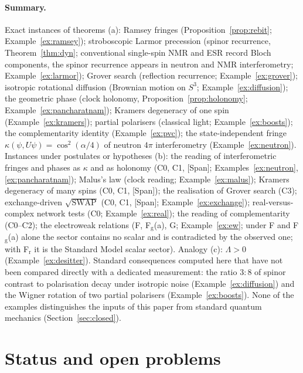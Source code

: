 \documentclass[aps,pra,onecolumn,superscriptaddress,nofootinbib,10pt]{revtex4-2}
\theoremstyle{definition}
\theoremstyle{remark}
\begin{document}
\paragraph{Summary.}  Exact instances of theorems (a): Ramsey fringes (Proposition~\ref{prop:rebit};
Example~\ref{ex:ramsey}); stroboscopic Larmor precession (spinor recurrence, Theorem~\ref{thm:dyn}; conventional single-spin NMR and
ESR record Bloch components, the spinor recurrence appears in neutron and NMR interferometry;
Example~\ref{ex:larmor}); Grover search (reflection
recurrence; Example~\ref{ex:grover}); isotropic rotational diffusion (Brownian motion on $S^3$;
Example~\ref{ex:diffusion}); the geometric phase (clock holonomy, Proposition~\ref{prop:holonomy};
Example~\ref{ex:pancharatnam}); Kramers degeneracy of one spin (Example~\ref{ex:kramers}); partial polarisers
(classical light; Example~\ref{ex:boosts}); the complementarity identity (Example~\ref{ex:pvc}); the
state-independent fringe $\kappa(\psi,U\psi)=\cos^2(\alpha/4)$ of neutron $4\pi$ interferometry
(Example~\ref{ex:neutron}).  Instances under postulates or hypotheses (b): the reading of interferometric
fringes and phases as $\kappa$ and as holonomy (C0, C1, [Span]; Examples~\ref{ex:neutron},
\ref{ex:pancharatnam}); Malus's law (clock reading; Example~\ref{ex:malus}); Kramers degeneracy of many spins
(C0, C1, [Span]); the realisation of Grover search (C3); exchange-driven $\sqrt{\mathrm{SWAP}}$ (C0, C1, [Span];
Example~\ref{ex:exchange}); real-versus-complex network tests (C0; Example~\ref{ex:real}); the reading of
complementarity (C0--C2); the electroweak relations (F, F$_{\mathrm g}$(a), G; Example~\ref{ex:ew}; under F and F$_{\mathrm g}$(a) alone the sector contains no scalar and is contradicted by the observed one; with F$_{\mathrm r}$ it is the Standard Model scalar sector).  Analogy (c): $\Lambda>0$
(Example~\ref{ex:desitter}).  Standard consequences computed here that have not been compared directly
with a dedicated measurement: the ratio $3:8$ of spinor contrast to polarisation decay under isotropic
noise (Example~\ref{ex:diffusion}) and the Wigner rotation of two partial polarisers
(Example~\ref{ex:boosts}).  None of the examples distinguishes the inputs of this paper from standard
quantum mechanics (Section~\ref{sec:closed}).

\section{Status and open problems}\label{sec:scope}
\end{document}
